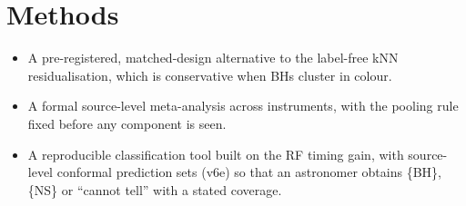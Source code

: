 \section{Methods}
\begin{itemize}
\item A pre-registered, matched-design alternative to the label-free kNN residualisation, which is conservative when BHs cluster in colour.
\item A formal source-level meta-analysis across instruments, with the pooling rule fixed before any component is seen.
\item A reproducible classification tool built on the RF timing gain, with source-level conformal prediction sets (v6e) so that an
astronomer obtains \{BH\}, \{NS\} or ``cannot tell'' with a stated coverage.
\end{itemize}
